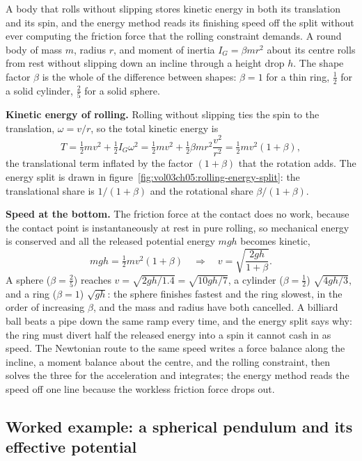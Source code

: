A body that rolls without slipping stores kinetic energy in both its
translation and its spin, and the energy method reads its finishing speed off
the split without ever computing the friction force that the rolling
constraint demands. A round body of mass $m$, radius $r$, and moment of
inertia $I_G = \beta m r^2$ about its centre rolls from rest without slipping
down an incline through a height drop $h$. The shape factor $\beta$ is the
whole of the difference between shapes: $\beta = 1$ for a thin ring, $\tfrac12$
for a solid cylinder, $\tfrac25$ for a solid sphere.

\textbf{Kinetic energy of rolling.} Rolling without slipping ties the spin to
the translation, $\omega = v/r$, so the total kinetic energy is
\[
T = \tfrac12 m v^2 + \tfrac12 I_G\omega^2
  = \tfrac12 m v^2 + \tfrac12\beta m r^2\frac{v^2}{r^2}
  = \tfrac12 m v^2(1 + \beta),
\]
the translational term inflated by the factor $(1+\beta)$ that the rotation
adds. The energy split is drawn in
figure~\ref{fig:vol03ch05:rolling-energy-split}: the translational share is
$1/(1+\beta)$ and the rotational share $\beta/(1+\beta)$.



\textbf{Speed at the bottom.} The friction force at the contact does no work,
because the contact point is instantaneously at rest in pure rolling, so
mechanical energy is conserved and all the released potential energy $mgh$
becomes kinetic,
\[
mgh = \tfrac12 m v^2(1 + \beta)
\quad\Longrightarrow\quad
v = \sqrt{\frac{2gh}{1 + \beta}}.
\]
A sphere ($\beta = \tfrac25$) reaches $v = \sqrt{2gh/1.4} = \sqrt{10gh/7}$, a
cylinder ($\beta = \tfrac12$) $\sqrt{4gh/3}$, and a ring ($\beta = 1$)
$\sqrt{gh}$: the sphere finishes fastest and the ring slowest, in the order of
increasing $\beta$, and the mass and radius have both cancelled. A billiard
ball beats a pipe down the same ramp every time, and the energy split says
why: the ring must divert half the released energy into a spin it cannot cash
in as speed. The Newtonian route to the same speed writes a force balance
along the incline, a moment balance about the centre, and the rolling
constraint, then solves the three for the acceleration and integrates; the
energy method reads the speed off one line because the workless friction
force drops out.

\subsection{Worked example: a spherical pendulum and its effective potential}

